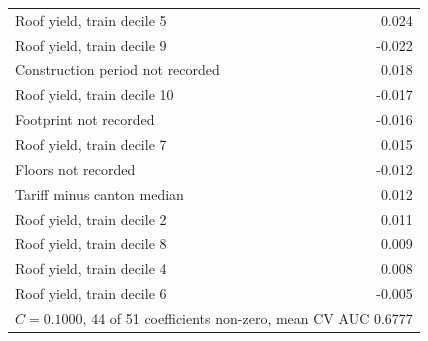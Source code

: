 \begin{tabular}{lr}
Roof yield, train decile 5 & 0.024 \\
Roof yield, train decile 9 & -0.022 \\
Construction period not recorded & 0.018 \\
Roof yield, train decile 10 & -0.017 \\
Footprint not recorded & -0.016 \\
Roof yield, train decile 7 & 0.015 \\
Floors not recorded & -0.012 \\
Tariff minus canton median & 0.012 \\
Roof yield, train decile 2 & 0.011 \\
Roof yield, train decile 8 & 0.009 \\
Roof yield, train decile 4 & 0.008 \\
Roof yield, train decile 6 & -0.005 \\
\midrule
\multicolumn{2}{l}{$C = 0.1000$, 44 of 51 coefficients non-zero, mean CV AUC 0.6777} \\
\bottomrule
\end{tabular}
